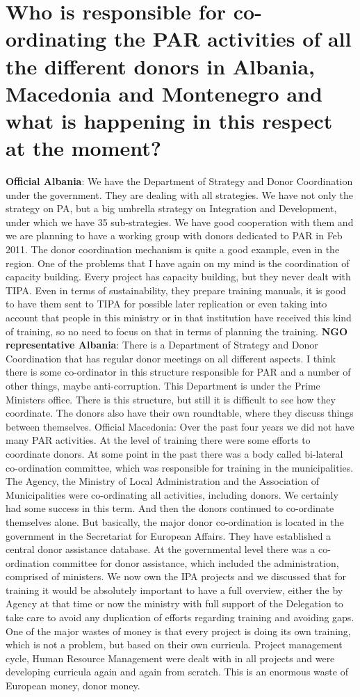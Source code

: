 \section{Who is responsible for co-ordinating the PAR activities of all the different donors in Albania, Macedonia and Montenegro and what is happening in this respect at the moment? }
\textbf{Official Albania}: We have the Department of Strategy and Donor Coordination under the government. They are dealing with all strategies. We have not only the strategy on PA, but a big umbrella strategy on Integration and Development, under which we have 35 sub-strategies. We have good cooperation with them and we are planning to have a working group with donors dedicated to PAR in Feb 2011. The donor coordination mechanism is quite a good example, even in the region. One of the problems that I have again on my mind is the coordination of capacity building. Every project has capacity building, but they never dealt with TIPA. Even in terms of sustainability, they prepare training manuals, it is good to have them sent to TIPA for possible later replication or even taking into account that people in this ministry or in that institution have received this kind of training, so no need to focus on that in terms of planning the training.
\textbf{NGO representative Albania}: There is a Department of Strategy and Donor Coordination that has regular donor meetings on all different aspects. I think there is some co-ordinator in this structure responsible for PAR and a number of other things, maybe anti-corruption. This Department is under the Prime Ministers office. There is this structure, but still it is difficult to see how they coordinate. The donors also have their own roundtable, where they discuss things between themselves.  
Official Macedonia: Over the past four years we did not have many PAR activities. At the level of training there were some efforts to coordinate donors. At some point in the past there was a body called bi-lateral co-ordination committee, which was responsible for training in the municipalities. The Agency, the Ministry of Local Administration and the Association of Municipalities were co-ordinating all activities, including donors. We certainly had some success in this term. And then the donors continued to co-ordinate themselves alone. But basically, the major donor co-ordination is located in the government in the Secretariat for European Affairs. They have established a central donor assistance database. At the governmental level there was a co-ordination committee for donor assistance, which included the administration, comprised of ministers. We now own the IPA projects and we discussed that for training it would be absolutely important to have a full overview,  either the by Agency at that time or now the ministry with full support of the Delegation to take care to avoid any duplication of efforts regarding training and avoiding gaps. One of the major wastes of money is that every project is doing its own training, which is not a problem, but based on their own curricula. Project management cycle, Human Resource Management were dealt with in all projects and were developing curricula again and again from scratch. This is an enormous waste of European money, donor money.
